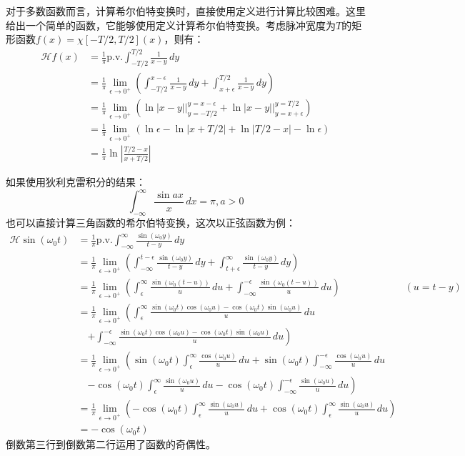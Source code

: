 \documentclass{ctexbook}
\begin{document}
\begin{example}[直接计算希尔伯特变换]
    对于多数函数而言，计算希尔伯特变换时，直接使用定义进行计算比较困难。这里给出一个简单的函数，它能够使用定义计算希尔伯特变换。考虑脉冲宽度为$T$的矩形函数$f(x)=\chi[-T/2,T/2](x)$，则有：
    \begin{align*}
        \mathcal{H} f(x)&=\frac{1}{\pi}\text{p.v.}\int_{-T/2}^{T/2}\frac{1}{x-y}\,dy\\
        &=\frac{1}{\pi}\lim_{\epsilon\to 0^+}\left(\int_{-T/2}^{x-\epsilon}\frac{1}{x-y}\,dy+\int_{x+\epsilon}^{T/2}\frac{1}{x-y}\,dy\right)\\
        &=\frac{1}{\pi}\lim_{\epsilon\to 0^+}\left(\ln|x-y|\Big|_{y=-T/2}^{y=x-\epsilon}+\ln|x-y|\Big|_{y=x+\epsilon}^{y=T/2}\right)\\
        &=\frac{1}{\pi}\lim_{\epsilon\to 0^+}\left(\ln \epsilon -\ln|x+T/2|+\ln|T/2 -x|-\ln \epsilon \right)\\
        &=\frac{1}{\pi}\ln\left|\frac{T/2 -x}{x+T/2}\right|
    \end{align*}
\end{example}

\begin{example}
    如果使用狄利克雷积分的结果：
    \[\int_{-\infty}^{\infty}\frac{\sin ax}{x}\,dx=\pi,a>0\]
    也可以直接计算三角函数的希尔伯特变换，这次以正弦函数为例：
    \begin{align*}
        \mathcal{H} \sin(\omega_0 t)&=\frac{1}{\pi}\text{p.v.}\int_{-\infty}^{\infty}\frac{\sin(\omega_0 y)}{t-y}\,dy\\
        &=\frac{1}{\pi}\lim_{\epsilon\to 0^+}\left(\int_{-\infty}^{t-\epsilon}\frac{\sin(\omega_0 y)}{t-y}\,dy+\int_{t+\epsilon}^{\infty}\frac{\sin(\omega_0 y)}{t-y}\,dy\right)\\
        &=\frac{1}{\pi}\lim_{\epsilon\to 0^+}\left(\int_{\epsilon}^{\infty}\frac{\sin(\omega_0 (t-u))}{u}\,du+\int_{-\infty}^{-\epsilon}\frac{\sin(\omega_0 (t-u))}{u}\,du\right)& (u=t-y)\\
        &=\frac{1}{\pi}\lim_{\epsilon\to 0^+}\left(\int_{\epsilon}^{\infty}\frac{\sin(\omega_0 t)\cos(\omega_0 u)-\cos(\omega_0 t)\sin(\omega_0 u)}{u}\,du\right.\\
        &\quad \left.+\int_{-\infty}^{-\epsilon}\frac{\sin(\omega_0 t)\cos(\omega_0 u)-\cos(\omega_0 t)\sin(\omega_0 u)}{u}\,du\right)\\
        &=\frac{1}{\pi}\lim_{\epsilon\to 0^+}\left(\sin(\omega_0 t)\int_{\epsilon}^{\infty}\frac{\cos(\omega_0 u)}{u}\,du+\sin(\omega_0 t)\int_{-\infty}^{-\epsilon}\frac{\cos(\omega_0 u)}{u}\,du\right.\\
        &\quad \left.-\cos(\omega_0 t)\int_{\epsilon}^{\infty}\frac{\sin(\omega_0 u)}{u}\,du-\cos(\omega_0 t)\int_{-\infty}^{-\epsilon}\frac{\sin(\omega_0 u)}{u}\,du\right)\\
        &=\frac{1}{\pi}\lim_{\epsilon\to 0^+}\left(-\cos(\omega_0 t)\int_{\epsilon}^{\infty}\frac{\sin(\omega_0 u)}{u}\,du+\cos(\omega_0 t)\int_{\epsilon}^{\infty}\frac{\sin(\omega_0 u)}{u}\,du\right)\\
        &=-\cos(\omega_0 t)
    \end{align*}
    倒数第三行到倒数第二行运用了函数的奇偶性。
\end{example}
\end{document}
